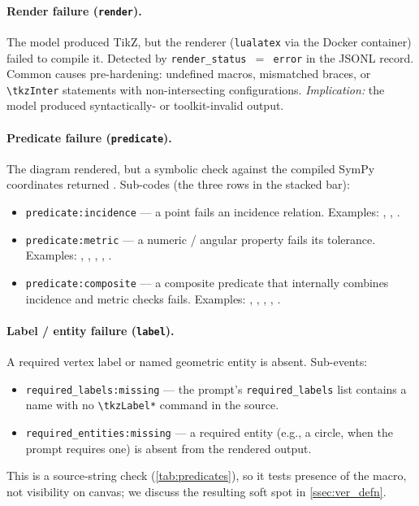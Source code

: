 \paragraph{\textbf{Render failure} (\texttt{render}).}
The model produced TikZ, but the renderer (\texttt{lualatex} via the Docker container) failed to compile it.
Detected by \texttt{render\_status\,$=$\,error} in the JSONL record.
Common causes pre-hardening: undefined macros, mismatched braces, or \texttt{\textbackslash tkzInter} statements with non-intersecting configurations.
\emph{Implication:} the model produced syntactically- or toolkit-invalid output.

\paragraph{\textbf{Predicate failure} (\texttt{predicate}).}
The diagram rendered, but a symbolic check against the compiled SymPy coordinates returned \false.
Sub-codes (the three rows in the stacked bar):
\begin{itemize}
\item \texttt{predicate:incidence} --- a point fails an incidence relation. Examples: , , .
\item \texttt{predicate:metric} --- a numeric / angular property fails its tolerance. Examples: , , , , .
\item \texttt{predicate:composite} --- a composite predicate that internally combines incidence and metric checks fails. Examples: , , , , .
\end{itemize}

\paragraph{\textbf{Label / entity failure} (\texttt{label}).}
A required vertex label or named geometric entity is absent.
Sub-events:
\begin{itemize}
\item \texttt{required\_labels:missing} --- the prompt's \texttt{required\_labels} list contains a name with no \texttt{\textbackslash tkzLabel*} command in the source.
\item \texttt{required\_entities:missing} --- a required entity (e.g., a circle, when the prompt requires one) is absent from the rendered output.
\end{itemize}
This is a source-string check (\cref{tab:predicates}), so it tests presence of the macro, not visibility on canvas; we discuss the resulting soft spot in \cref{ssec:ver_defn}.


